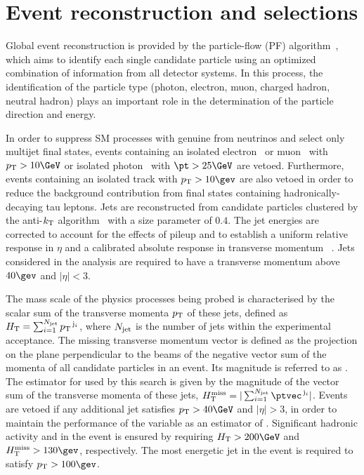 \section{Event reconstruction and selections} 
\label{sec:event_selection}

Global event reconstruction is provided by the particle-flow (PF)
algorithm~\cite{CMS-PAS-PFT-09-001, CMS-PAS-PFT-10-001}, which aims to
identify each single candidate particle using an optimized combination
of information from all detector systems. In this process, the
identification of the particle type (photon, electron, muon, charged
hadron, neutral hadron) plays an important role in the determination
of the particle direction and energy. 

In order to suppress SM processes with genuine \ptvecmiss from
neutrinos and select only multijet final states, events containing an
isolated electron~\cite{PAS-EGM-10-004} or muon~\cite{PAS-MUO-10-004}
with $\Pt > 10\GeV$ or isolated photon~\cite{PAS-EGM-10-006} with $\pt
> 25\GeV$ are vetoed. Furthermore, events containing an isolated track
with $\Pt > 10\gev$ are also vetoed in order to reduce the background
contribution from final states containing hadronically-decaying tau
leptons. Jets are reconstructed from candidate particles clustered by
the anti-$k_{\rm T}$ algorithm~\cite{antikt} with a size parameter of
$0.4$. The jet energies are corrected to account for the effects of
pileup and to establish a uniform relative response in $\eta$ and a
calibrated absolute response in transverse momentum
\pt~\cite{cms-jets}. Jets considered in the analysis are required to
have a transverse momentum above $40\gev$ and $|\eta| < 3$.

The mass scale of the physics processes being probed is characterised
by the scalar sum of the transverse momenta ${p_{\text T}}$ of these jets,
defined as $H_{\mathrm{T}} = \sum_{i=1}^{N_{\rm jet}} {p_{\text T}}^{\,\mathrm{j}_i}$,
where $N_{\rm jet}$ is the number of jets within the experimental
acceptance. The missing transverse momentum vector \ptvecmiss is
defined as the projection on the plane perpendicular to the beams of
the negative vector sum of the momenta of all candidate particles in
an event. Its magnitude is referred to as \ETmiss. The estimator for
\ETmiss used by this search is given by the magnitude of the vector
sum of the transverse momenta of these jets, $\mht =
|\sum_{i=1}^{N_\text{jet}} \ptvec^{\,\mathrm{j}_i}|$. Events are
vetoed if any additional jet satisfies $\Pt > 40\GeV$ and $|\eta| >
3$, in order to maintain the performance of the variable \mht as an
estimator of \ETmiss. Significant hadronic activity and \ptvecmiss in
the event is ensured by requiring $\scalht > 200\GeV$ and $\mht >
130\gev$, respectively. The most energetic jet in the event is
required to satisfy $\Pt > 100\gev$.

